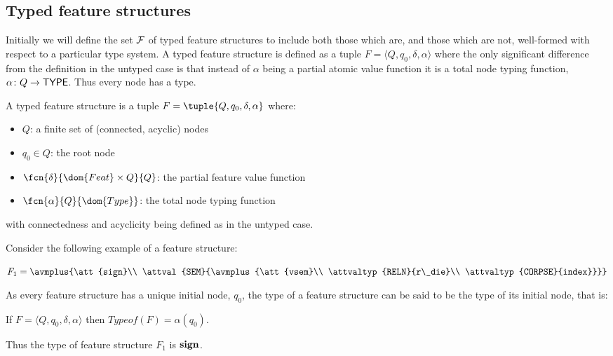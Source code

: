 \documentclass[12pt]{report}
\begin{document}
\subsection{Typed feature structures}
\label{formtfs}

Initially we will 
define the set $\cal F$ of typed feature structures to include 
both those which are, and those which are not, well-formed with respect
to a particular type system.
A typed feature structure is defined as a tuple 
$F = \langle Q, q_{0}, \delta, \alpha \rangle$ 
where the only significant difference from the definition in the
untyped case 
is that instead of $\alpha$ being a partial atomic value function it is
a total node typing function, $\alpha\colon Q \rightarrow {\sf TYPE}$.  
Thus every node has a type.
\begin{definition}
A typed feature structure is a tuple $F =
\tuple{Q,q_{0},\delta,\alpha}$ where:
\begin{itemize}
\item
$Q$:  a finite set of (connected, acyclic) nodes 
\item
$q_{0} \in Q$: the root node
\item
$\fcn{\delta}{\dom{Feat} \times Q}{Q}$:  
the partial feature value function
\item
$\fcn{\alpha}{Q}{\dom{Type}}$: the total node typing function
\end{itemize}
with connectedness and acyclicity being defined as in the
untyped case.
\end{definition}

Consider the following example of a feature structure:
\begin{center}
{\tiny
   $F_{1}=\avmplus{\att{sign}\\
             \attval{SEM}{\avmplus{\att{vsem}\\
                                   \attvaltyp{RELN}{r\_die}\\
                                   \attvaltyp{CORPSE}{index}}}}$}
\end{center}
As every feature structure has a unique initial node, $q_{0}$, the
type of a feature structure can be said to be
the type of its initial node, that is: 
\begin{definition}
If $F = \langle Q, q_{0}, \delta, \alpha \rangle$ 
then $Typeof(F) = \alpha(q_{0})$. 
\end{definition}
Thus the type of feature structure $F_{1}$ is $\bf sign$.  
\end{document}
